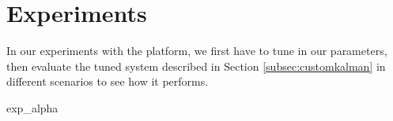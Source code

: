 \documentclass[class=article, crop=false]{standalone}
\begin{document}
\chapter{Experiments}\label{cha:exp}

In our experiments with the platform, we first have to tune in our parameters, then evaluate the tuned system described in Section \ref{subsec:customkalman} in different scenarios to see how it performs.

{exp_alpha}




\end{document}
